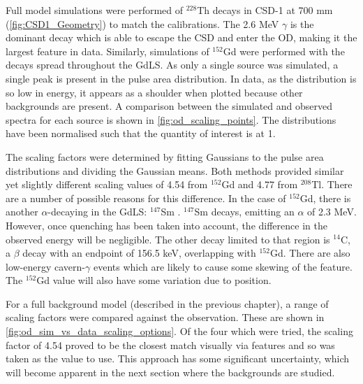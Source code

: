 \par
Full model simulations were performed of ${}^{228}$Th decays in CSD-1 at 700 mm (\autoref{fig:CSD1_Geometry}) to match the calibrations.
The 2.6 MeV $\gamma$ is the dominant decay which is able to escape the CSD and enter the OD, making it the largest feature in data.
Similarly, simulations of ${}^{152}$Gd were performed with the decays spread throughout the GdLS.
As only a single source was simulated, a single peak is present in the pulse area distribution.
In data, as the distribution is so low in energy, it appears as a shoulder when plotted because other backgrounds are present.
A comparison between the simulated and observed spectra for each source is shown in \autoref{fig:od_scaling_points}.
The distributions have been normalised such that the quantity of interest is at 1.

\par
The scaling factors were determined by fitting Gaussians to the pulse area distributions and dividing the Gaussian means.
Both methods provided similar yet slightly different scaling values of 4.54 from ${}^{152}$Gd and 4.77 from ${}^{208}$Tl.
There are a number of possible reasons for this difference.
In the case of ${}^{152}$Gd, there is another $\alpha$-decaying in the GdLS: ${}^{147}$Sm \cite{scotthaselschwardt_thesis_ref}.
${}^{147}$Sm decays, emitting an $\alpha$ of 2.3 MeV. 
However, once quenching has been taken into account, the difference in the observed energy will be negligible.
The other decay limited to that region is ${}^{14}$C, a $\beta$ decay with an endpoint of 156.5 keV, overlapping with ${}^{152}$Gd.
There are also low-energy cavern-$\gamma$ events which are likely to cause some skewing of the feature.
The ${}^{152}$Gd value will also have some variation due to position.

\par
For a full background model (described in the previous chapter), a range of scaling factors were compared against the observation.
These are shown in \autoref{fig:od_sim_vs_data_scaling_options}.
Of the four which were tried, the scaling factor of 4.54 proved to be the closest match visually via features and so was taken as the value to use.
This approach has some significant uncertainty, which will become apparent in the next section where the backgrounds are studied.







